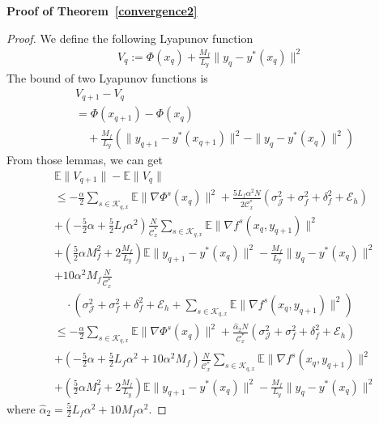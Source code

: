 \documentclass[lettersize,journal]{IEEEtran}
\begin{document}
\textbf{Proof of Theorem~\ref{convergence2}}
\begin{proof}
We define the following Lyapunov function
\begin{align*}
    V_q:=\Phi(x_q)+\frac{M_f}{L_y}\|y_q-y^*(x_q)\|^2
\end{align*}
The bound of two Lyapunov functions is  
\begin{align*}
    &V_{q+1}-V_{q}\\&=\Phi(x_{q+1})-\Phi(x_q)\\&\quad+\frac{M_f}{L_y}\left( \|y_{q+1}-y^*(x_{q+1})\|^2-\|y_q-y^*(x_q)\|^2\right)
\end{align*}  
From those lemmas, we can get  
\begin{subequations}
\begin{align}
    &\mathbb{E}\| V_{q+1}\|-\mathbb{E}\|V_{q} \|\nonumber\\&\leq-\frac{\alpha}{2}\sum_{s\in \mathcal{K}_{q,x}}\mathbb{E}\|\nabla \Phi^s(x_{q})\|^2+\frac{5L_f\alpha^2 N}{2\mathcal{C}_x^*}(\sigma_{\mathcal{J}}^2+\sigma_f^2+\delta^2_f+\mathcal{E}_h)\nonumber\\
    &+(-\frac{5}{2}\alpha+\frac{5}{2} L_f\alpha^2)\frac{N}{\mathcal{C}_x^*}\sum_{s\in \mathcal{K}_{q,x}}\mathbb{E}\|\nabla f^s(x_{q},y_{q+1})\|^2\nonumber\\
    &+(\frac{5}{2}\alpha M_f^2+2\frac{M_f}{L_y})\mathbb{E}\|y_{q+1}-y^*(x_q)\|^2-\frac{M_f}{L_y}\|y_q-y^*(x_q)\|^2\nonumber\\
    &+10\alpha^2M_f\frac{N}{\mathcal{C}_x^*}\nonumber\\&\quad\cdot(\sigma_{\mathcal{J}}^2+\sigma_f^2+\delta^2_f+\mathcal{E}_h+\sum_{s\in \mathcal{K}_{q,x}}\mathbb{E}\|\nabla f^s(x_{q},y_{q+1})\|^2)\nonumber\\
    &\leq -\frac{\alpha}{2}\sum_{s\in \mathcal{K}_{q,x}}\mathbb{E}\|\nabla \Phi^s(x_{q})\|^2+\frac{\hat{\alpha}_2 N}{\mathcal{C}_x^*}(\sigma_{\mathcal{J}}^2+\sigma_f^2+\delta^2_f+\mathcal{E}_h)\nonumber\\
    &+(-\frac{5}{2}\alpha+\frac{5}{2} L_f\alpha^2+10\alpha^2M_f)\frac{N}{\mathcal{C}_x^*}\sum_{s\in \mathcal{K}_{q,x}}\mathbb{E}\|\nabla f^s(x_{q},y_{q+1})\|^2\label{eq:lya_a}\\
    &+(\frac{5}{2}\alpha M_f^2+2\frac{M_f}{L_y})\mathbb{E}\|y_{q+1}-y^*(x_q)\|^2-\frac{M_f}{L_y}\|y_q-y^*(x_q)\|^2\label{eq:lya_b}
\end{align}
\end{subequations}
where $\hat{\alpha}_2=\frac{5}{2}L_f\alpha^2+10M_f\alpha^2$.


\end{proof}
\end{document}
